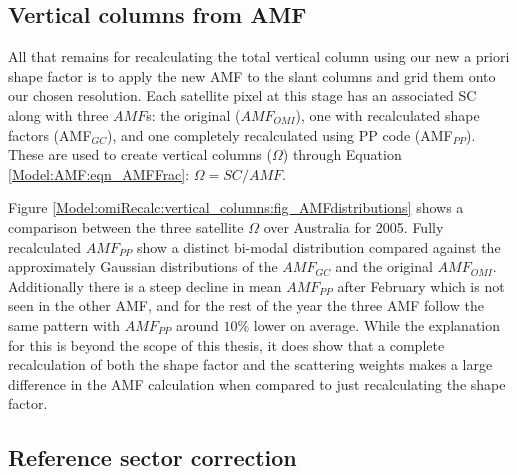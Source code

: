   \subsection{Vertical columns from AMF}
    \label{Model:omiRecalc:vertical_columns}
    All that remains for recalculating the total vertical column using our new a priori shape factor is to apply the new AMF to the slant columns and grid them onto our chosen resolution.
    Each satellite pixel at this stage has an associated SC along with three $AMF$s: the original ($AMF_{OMI}$), one with recalculated shape factors (AMF$_{GC}$), and one completely recalculated using PP code (AMF$_{PP}$).
    These are used to create vertical columns ($\Omega$) through Equation \ref{Model:AMF:eqn_AMFFrac}: $\Omega = SC/AMF$.
    
    Figure \ref{Model:omiRecalc:vertical_columns:fig_AMFdistributions} shows a comparison between the three satellite $\Omega$ over Australia for 2005. 
    Fully recalculated $AMF_{PP}$ show a distinct bi-modal distribution compared against the approximately Gaussian distributions of the $AMF_{GC}$ and the original $AMF_{OMI}$.
    Additionally there is a steep decline in mean $AMF_{PP}$ after February which is not seen in the other AMF, and for the rest of the year the three AMF follow the same pattern with $AMF_{PP}$ around $10\%$ lower on average.
    While the explanation for this is beyond the scope of this thesis, it does show that a complete recalculation of both the shape factor and the scattering weights makes a large difference in the AMF calculation when compared to just recalculating the shape factor.
    
    
  \subsection{Reference sector correction}
    \label{Model:omiRecalc:RSC}
    
